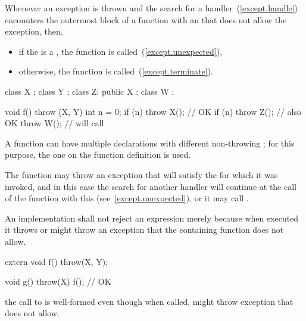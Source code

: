 \pnum
{}%
%
Whenever an exception is thrown and the search for a handler~(\ref{except.handle})
encounters the outermost block of a function with an
 that does not allow the exception, then,

\begin{itemize}
\item if the  is a
, the function
 is called~(\ref{except.unexpected}),

%
%
\item otherwise, the function  is called~(\ref{except.terminate}).
\end{itemize}

\enterexample
\begin{codeblock}
class X { };
class Y { };
class Z: public X { };
class W { };

void f() throw (X, Y) {
  int n = 0;
  if (n) throw X();             // OK
  if (n) throw Z();             // also OK
  throw W();                    // will call 
}
\end{codeblock}
\exitexample

\enternote A function can have multiple declarations with different non-throwing
; for this purpose, the one on the
function definition is used. \exitnote

\pnum
{}%
The function
may throw an exception that will satisfy the
for which it was invoked, and in this case the search for another handler
will continue at the call of the function with this
(see~\ref{except.unexpected}), or it may call
.

\pnum
An implementation shall not reject an expression merely because when
executed it throws or might
throw an exception that the containing function does not allow.
\enterexample
\begin{codeblock}
extern void f() throw(X, Y);

void g() throw(X) {
  f();                          // OK
}

\end{codeblock}
the call to
is well-formed even though when called,
might throw exception
that
does not allow.
\exitexample

